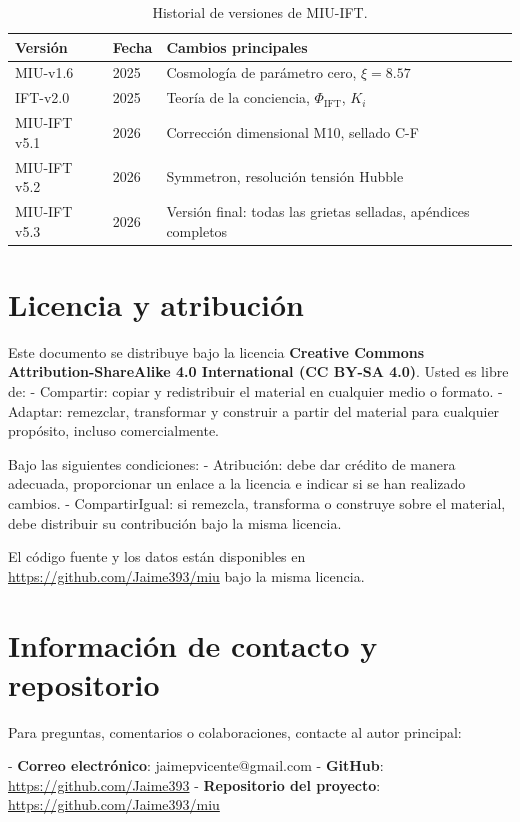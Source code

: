 \documentclass[12pt, a4paper]{article}
\theoremstyle{miuThm}
\theoremstyle{remark}
\begin{document}
\begin{table}[h!]
\centering
\caption{Historial de versiones de MIU-IFT.}
\label{tab:versiones}
\begin{tabular}{lll}
\toprule
\textbf{Versión} & \textbf{Fecha} & \textbf{Cambios principales} \\
\midrule
MIU-v1.6 & 2025 & Cosmología de parámetro cero, $\xi=8.57$ \\
IFT-v2.0 & 2025 & Teoría de la conciencia, $\Phi_{\text{IFT}}$, $K_i$ \\
MIU-IFT v5.1 & 2026 & Corrección dimensional M10, sellado C-F \\
MIU-IFT v5.2 & 2026 & Symmetron, resolución tensión Hubble \\
MIU-IFT v5.3 & 2026 & Versión final: todas las grietas selladas, apéndices completos \\
\bottomrule
\end{tabular}
\end{table}

\clearpage
\section{Licencia y atribución}

Este documento se distribuye bajo la licencia \textbf{Creative Commons Attribution-ShareAlike 4.0 International (CC BY-SA 4.0)}. Usted es libre de:
- Compartir: copiar y redistribuir el material en cualquier medio o formato.
- Adaptar: remezclar, transformar y construir a partir del material para cualquier propósito, incluso comercialmente.

Bajo las siguientes condiciones:
- Atribución: debe dar crédito de manera adecuada, proporcionar un enlace a la licencia e indicar si se han realizado cambios.
- CompartirIgual: si remezcla, transforma o construye sobre el material, debe distribuir su contribución bajo la misma licencia.

El código fuente y los datos están disponibles en \url{https://github.com/Jaime393/miu} bajo la misma licencia.

\clearpage
\section{Información de contacto y repositorio}

Para preguntas, comentarios o colaboraciones, contacte al autor principal:

- \textbf{Correo electrónico}: jaimepvicente@gmail.com
- \textbf{GitHub}: \url{https://github.com/Jaime393}
- \textbf{Repositorio del proyecto}: \url{https://github.com/Jaime393/miu}
\end{document}
